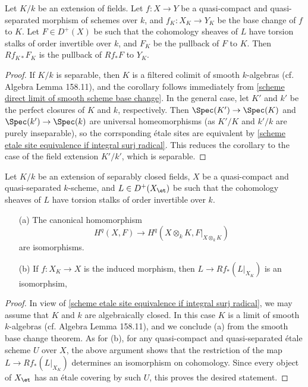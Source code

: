 \begin{corollary}\label{scheme qcqs over field extension direct image base change}
Let $K/k$ be an extension of fields. Let $f:X\to Y$ be a quasi-compact and quasi-separated morphism of schemes over $k$, and $f_K:X_K\to Y_K$ be the base change of $f$ to $K$. Let $F\in D^+(X)$ be such that the cohomology sheaves of $L$ have torsion stalks of order invertible over $k$, and $F_K$ be the pullback of $F$ to $K$. Then $Rf_{K*}F_K$ is the pullback of $Rf_*F$ to $Y_K$. 
\end{corollary}
\begin{proof}
If $K/k$ is separable, then $K$ is a filtered colimit of smooth $k$-algebras (cf. \cite{SP} Algebra Lemma 158.11), and the corollary follows immediately from \cref{scheme direct limit of smooth scheme base change}. In the general case, let $K'$ and $k'$ be the perfect closures of $K$ and $k$, respectively. Then $\Spec(K')\to\Spec(K)$ and $\Spec(k')\to\Spec(k)$ are universal homeomorphisms (as $K'/K$ and $k'/k$ are purely inseparable), so the corrsponding \'etale sites are equivalent by \cref{scheme etale site equivalence if integral surj radical}. This reduces the corollary to the case of the field extension $K'/k'$, which is separable.
\end{proof}

\begin{corollary}\label{scheme etale cohomology field extension sp closed isomorphism}
Let $K/k$ be an extension of separably closed fields, $X$ be a quasi-compact and quasi-separated $k$-scheme, and $L\in D^+(X_\et)$ be such that the cohomology sheaves of $L$ have torsion stalks of order invertible over $k$.
\begin{enumerate}
    \item[(a)] The canonical homomorphism
    \[H^q(X,F)\to H^q(X\otimes_kK,F|_{X\otimes_kK})\]
    are isomorphisms.
    \item[(b)] If $f:X_K\to X$ is the induced morphism, then $L\to Rf_*(L|_{X_K})$ is an isomorphsim,
\end{enumerate}
\end{corollary}
\begin{proof}
In view of \cref{scheme etale site equivalence if integral surj radical}, we may assume that $K$ and $k$ are algebraically closed. In this case $K$ is a limit of smooth $k$-algebras (cf. \cite{SP} Algebra Lemma 158.11), and we conclude (a) from the smooth base change theorem. As for (b), for any quasi-compact and quasi-separated \'etale scheme $U$ over $X$, the above argument shows that the restriction of the map $L\to Rf_*(L|_{X_K})$ determines an isomorphism on cohomology. Since every object of $X_\et$ has an étale covering by such $U$, this proves the desired statement.
\end{proof}

